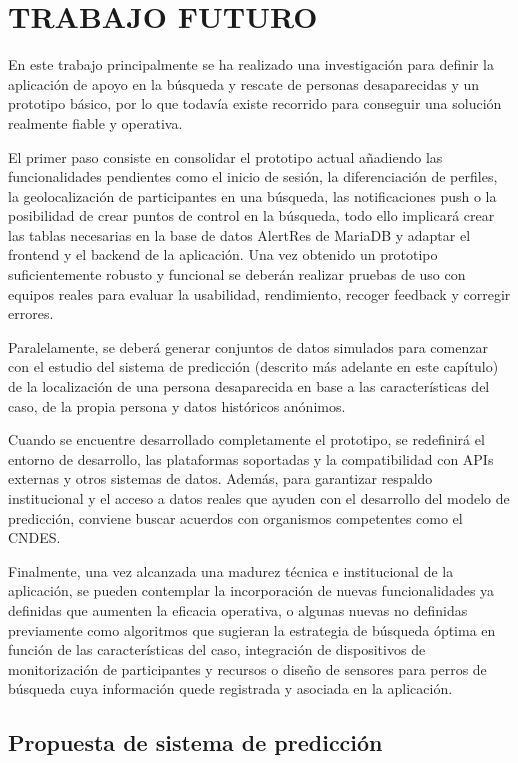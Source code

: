 \chapter{TRABAJO FUTURO} \label{TrabajoFuturo}

En este trabajo principalmente se ha realizado una investigación para definir la aplicación de apoyo en la búsqueda y rescate de personas desaparecidas y un prototipo básico, por lo que todavía existe recorrido para conseguir una solución realmente fiable y operativa.

El primer paso consiste en consolidar el prototipo actual añadiendo las funcionalidades pendientes como el inicio de sesión, la diferenciación de perfiles, la geolocalización de participantes en una búsqueda, las notificaciones push o la posibilidad de crear puntos de control en la búsqueda, todo ello implicará crear las tablas necesarias en la base de datos AlertRes de MariaDB y adaptar el frontend y el backend de la aplicación. Una vez obtenido un prototipo suficientemente robusto y funcional se deberán realizar pruebas de uso con equipos reales para evaluar la usabilidad, rendimiento, recoger feedback y corregir errores.

Paralelamente, se deberá generar conjuntos de datos simulados para comenzar con el estudio del sistema de predicción (descrito más adelante en este capítulo) de la localización de una persona desaparecida en base a las características del caso, de la propia persona y datos históricos anónimos.

Cuando se encuentre desarrollado completamente el prototipo, se redefinirá el entorno de desarrollo, las plataformas soportadas y la compatibilidad con APIs externas y otros sistemas de datos. Además, para garantizar respaldo institucional y el acceso a datos reales que ayuden con el desarrollo del modelo de predicción, conviene buscar acuerdos con organismos competentes como el CNDES.

Finalmente, una vez alcanzada una madurez técnica e institucional de la aplicación, se pueden contemplar la incorporación de nuevas funcionalidades ya definidas que aumenten la eficacia operativa, o algunas nuevas no definidas previamente como algoritmos que sugieran la estrategia de búsqueda óptima en función de las características del caso, integración de dispositivos de monitorización de participantes y recursos o diseño de sensores para perros de búsqueda cuya información quede registrada y asociada en la aplicación.

\section{Propuesta de sistema de predicción}

